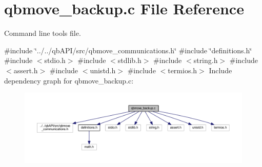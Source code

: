 \section{qbmove\+\_\+backup.\+c File Reference}
\label{qbmove__backup_8c}


Command line tools file.  


{\ttfamily \#include \char`\"{}../../qb\+A\+P\+I/src/qbmove\+\_\+communications.\+h\char`\"{}}\newline
{\ttfamily \#include \char`\"{}definitions.\+h\char`\"{}}\newline
{\ttfamily \#include $<$stdio.\+h$>$}\newline
{\ttfamily \#include $<$stdlib.\+h$>$}\newline
{\ttfamily \#include $<$string.\+h$>$}\newline
{\ttfamily \#include $<$assert.\+h$>$}\newline
{\ttfamily \#include $<$unistd.\+h$>$}\newline
{\ttfamily \#include $<$termios.\+h$>$}\newline
Include dependency graph for qbmove\+\_\+backup.\+c\+:\nopagebreak
\begin{figure}[H]
\begin{center}
\leavevmode
\includegraphics[width=350pt]{qbmove__backup_8c__incl}
\end{center}
\end{figure}
